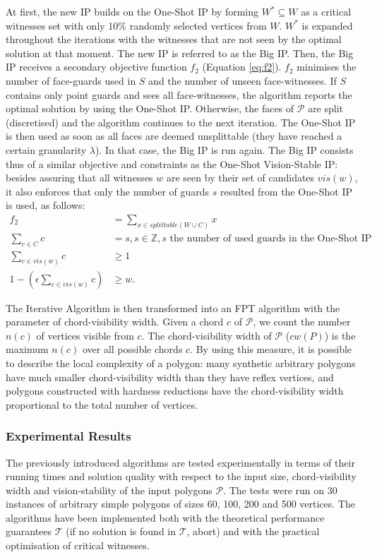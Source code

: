 At first, the new IP builds on the One-Shot IP by forming $W^* \subseteq W$ as a critical witnesses set with only 10\% randomly selected vertices from $W$. $W^*$ is expanded throughout the iterations with the witnesses that are not seen by the optimal solution at that moment. The new IP is referred to as the Big IP.
Then, the Big IP receives a secondary objective function $f_2$ (Equation \ref{eq:f2}). $f_2$ minimises the number of face-guards used in $S$ and the number of unseen face-witnesses. If $S$ contains only point guards and sees all face-witnesses, the algorithm reports the optimal solution by using the One-Shot IP. Otherwise, the faces of $\mathcal P$ are split (discretised) and the algorithm continues to the next iteration. The One-Shot IP is then used as soon as all faces are deemed unsplittable (they have reached a certain granularity $\lambda$). In that case, the Big IP is run again. The Big IP consists thus of a similar objective and constraints as the One-Shot Vision-Stable IP: besides assuring that all witnesses $w$ are seen by their set of candidates $vis(w)$, it also enforces that only the number of guards $s$ resulted from the One-Shot IP is used, as follows: 
\begin{align}
	f_2 &= \sum_{x \in splittable(W \cup C)} x \label{eq:f2}\\
	\sum_{c \in C} c &= s, s \in \mathbb Z, s \text{ the number of used guards in the One-Shot IP} \\
	\sum_{c \in vis(w)} c &\geq 1 \\
	1 - (\epsilon \sum_{c \in vis(w)} c) &\geq w.
\end{align}

The Iterative Algorithm is then transformed into an FPT algorithm with the parameter of chord-visibility width. Given a chord $c$ of $\mathcal P$, we count the number $n(c)$ of vertices visible from $c$. The chord-visibility width of $\mathcal P$ ($cw(P)$)  is the maximum $n(c)$ over all possible chords $c$. By using this measure, it is possible to describe the local complexity of a polygon: many synthetic arbitrary polygons have much smaller chord-visibility width than they have reflex vertices, and polygons constructed with hardness reductions have the chord-visibility width proportional to the total number of vertices. 

\subsubsection{Experimental Results}
The previously introduced algorithms are tested experimentally in terms of their running times and solution quality with respect to the input size, chord-visibility width and vision-stability of the input polygons $\mathcal P$. The tests were run on 30 instances of arbitrary simple polygons of sizes 60, 100, 200 and 500 vertices. The algorithms have been implemented both with the theoretical performance guarantees $\mathcal T$ (if no solution is found in $\mathcal T$, abort) and with the practical optimisation of critical witnesses.

